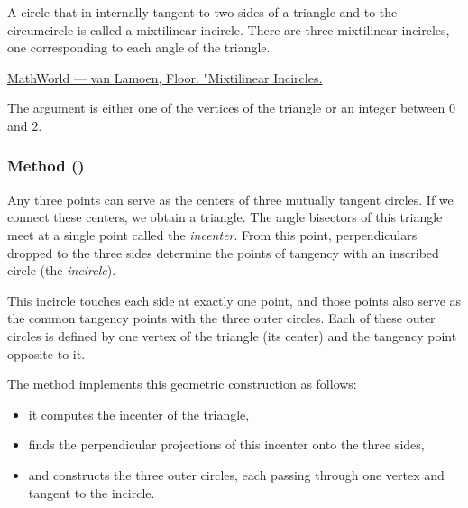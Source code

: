 A circle that in internally tangent to two sides of a triangle and to the circumcircle is called a mixtilinear incircle. There are three mixtilinear incircles, one corresponding to each angle of the triangle.
\begin{flushright}
\small
\href{https://mathworld.wolfram.com/MixtilinearIncircles.html}{MathWorld — van Lamoen, Floor. "Mixtilinear Incircles.}
\end{flushright}

The argument is either one of the vertices of the triangle or an integer between $0$
 and $2$.

\begin{tkzexample}[latex=.52\textwidth]
\end{tkzexample}

\subsubsection{Method ()}
\label{ssub:method_triangle_three_tgt_c}

Any three points can serve as the centers of three mutually tangent circles.
If we connect these centers, we obtain a triangle.
The angle bisectors of this triangle meet at a single point called the \emph{incenter}.
From this point, perpendiculars dropped to the three sides determine the points of tangency with an inscribed circle (the \emph{incircle}).

\medskip
This incircle touches each side at exactly one point, and those points also serve as the common tangency points with the three outer circles.
Each of these outer circles is defined by one vertex of the triangle (its center) and the tangency point opposite to it.

\medskip
The method  implements this geometric construction as follows:
\begin{itemize}
  \item it computes the incenter of the triangle,
  \item finds the perpendicular projections of this incenter onto the three sides,
  \item and constructs the three outer circles, each passing through one vertex and tangent to the incircle.
\end{itemize}

